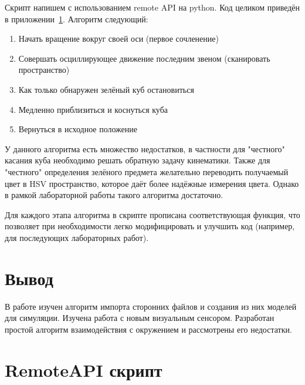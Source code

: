 \documentclass[14pt]{extarticle}
\begin{document}
    Скрипт напишем с использованием remote API на python. Код целиком приведён в приложении~\ref{code:remoteAPI}.
    Алгоритм следующий:
    \begin{enumerate}
        \item Начать вращение вокруг своей оси (первое сочленение)
        \item Совершать осциллирующее движение последним звеном (сканировать пространство)
        \item Как только обнаружен зелёный куб остановиться
        \item Медленно приблизиться и коснуться куба
        \item Вернуться в исходное положение
    \end{enumerate}

    У данного алгоритма есть множество недостатков, в частности для "честного" касания куба необходимо решать обратную
    задачу кинематики. Также для "честного" определения зелёного предмета желательно переводить получаемый цвет в
    HSV пространство, которое даёт более надёжные измерения цвета. Однако в рамкой лабораторной работы такого алгоритма
    достаточно.

    Для каждого этапа алгоритма в скрипте прописана соответствующая функция, что позволяет при необходимости легко
    модифицировать и улучшить код (например, для последующих лабораторных работ).

    \section*{Вывод}
    В работе изучен алгоритм импорта сторонних файлов и создания из них моделей для симуляции. Изучена работа с новым
    визуальным сенсором. Разработан простой алгоритм взаимодействия с окружением и рассмотрены его недостатки.


    \appendix
    \renewcommand{\thesection}{\Asbuk{section}}


    \section{RemoteAPI скрипт}\label{code:remoteAPI}
\end{document}
